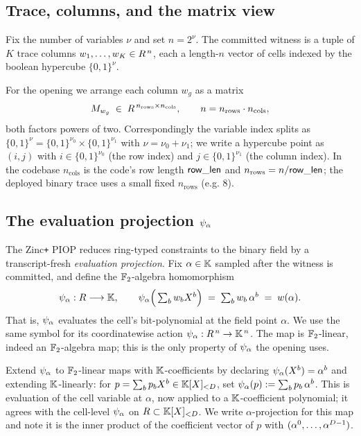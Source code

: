 \subsection{Trace, columns, and the matrix view}

Fix the number of variables $\nu$ and set $n = 2^{\nu}$. The committed
witness is a tuple of $K$ trace columns
$w_1, \dots, w_K \in R^{\,n}$, each a length-$n$ vector of cells
indexed by the boolean hypercube $\{0,1\}^{\nu}$.

For the opening we arrange each column $w_g$ as a matrix
\[
  M_{w_g} \;\in\; R^{\,n_{\mathrm{rows}} \times n_{\mathrm{cols}}},
  \qquad
  n = n_{\mathrm{rows}} \cdot n_{\mathrm{cols}},
\]
both factors powers of two. Correspondingly the variable index splits as
$\{0,1\}^{\nu} = \{0,1\}^{\nu_0} \times \{0,1\}^{\nu_1}$ with
$\nu = \nu_0 + \nu_1$; we write a hypercube point as $(i,j)$ with
$i \in \{0,1\}^{\nu_0}$ (the row index) and $j \in \{0,1\}^{\nu_1}$ (the
column index). In the codebase $n_{\mathrm{cols}}$ is the code's row
length $\mathsf{row\_len}$ and $n_{\mathrm{rows}} = n / \mathsf{row\_len}$;
the deployed binary trace uses a small fixed $n_{\mathrm{rows}}$ (e.g.
$8$).

\subsection{The evaluation projection $\psi_{\alpha}$}

The Zinc\texttt{+} PIOP reduces ring-typed constraints to the binary
field by a transcript-fresh \emph{evaluation projection}. Fix
$\alpha \in \mathbb{K}$ sampled after the witness is committed, and define the
$\mathbb{F}_2$-algebra homomorphism
\[
  \psi_{\alpha} : R \longrightarrow \mathbb{K},
  \qquad
  \psi_{\alpha}\Big(\textstyle\sum_b w_b X^b\Big) \;=\; \sum_b w_b\,\alpha^b
  \;=\; w(\alpha).
\]
That is, $\psi_{\alpha}$ evaluates the cell's bit-polynomial at the field point
$\alpha$. We use the same symbol for its coordinatewise action
$\psi_{\alpha} : R^{\,n} \to \mathbb{K}^{\,n}$. The map is $\mathbb{F}_2$-linear,
indeed an $\mathbb{F}_2$-algebra map; this is the only property of $\psi_{\alpha}$ the
opening uses.

\begin{remark}
\label{rem:psi-extends}
Extend $\psi_{\alpha}$ to $\mathbb{F}_2$-linear maps with $\mathbb{K}$-coefficients by
declaring $\psi_{\alpha}(X^b) = \alpha^b$ and extending $\mathbb{K}$-linearly: for
$p = \sum_b p_b X^b \in \mathbb{K}[X]_{<D}$, set $\psi_{\alpha}(p) := \sum_b p_b\,\alpha^b$.
This is evaluation of the cell variable at $\alpha$, now applied to a
$\mathbb{K}$-coefficient polynomial; it agrees with the cell-level $\psi_{\alpha}$ on
$R \subset \mathbb{K}[X]_{<D}$. We write $\alpha$-projection for this map
and note it is the inner product of the coefficient vector of $p$ with
$(\alpha^0, \dots, \alpha^{D-1})$.
\end{remark}

